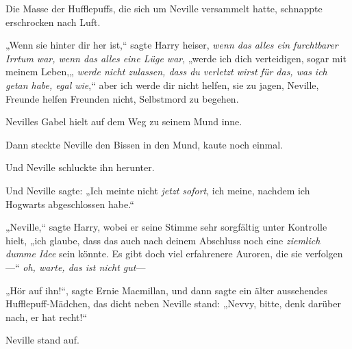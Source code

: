 Die Masse der Hufflepuffs, die sich um Neville versammelt hatte, schnappte erschrocken nach Luft.

„Wenn sie hinter dir her ist,“ sagte Harry heiser, \emph{wenn das alles ein furchtbarer Irrtum war, wenn das alles eine Lüge war}, „werde ich dich verteidigen, sogar mit meinem Leben,„ \emph{werde nicht zulassen, dass du verletzt wirst für das, was ich getan habe, egal wie},“ aber ich werde dir nicht helfen, sie zu jagen, Neville, Freunde helfen Freunden nicht, Selbstmord zu begehen.

Nevilles Gabel hielt auf dem Weg zu seinem Mund inne.

Dann steckte Neville den Bissen in den Mund, kaute noch einmal.

Und Neville schluckte ihn herunter.

Und Neville sagte: „Ich meinte nicht \emph{jetzt sofort}, ich meine, nachdem ich Hogwarts abgeschlossen habe.“

„Neville,“ sagte Harry, wobei er seine Stimme sehr sorgfältig unter Kontrolle hielt, „ich glaube, dass das auch nach deinem Abschluss noch eine \emph{ziemlich dumme} \emph{Idee} sein könnte. Es gibt doch viel erfahrenere Auroren, die sie verfolgen—“ \emph{oh, warte, das ist nicht gut}—

„Hör auf ihn!“, sagte Ernie Macmillan, und dann sagte ein älter aussehendes Hufflepuff-Mädchen, das dicht neben Neville stand: „Nevvy, bitte, denk darüber nach, er hat recht!“

Neville stand auf.

